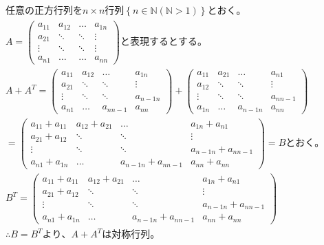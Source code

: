 \documentclass[dvipdfmx,uplatex]{jsarticle}
\begin{document}
  \newpage
  \begin{equation}
    \begin{aligned}
        &任意の正方行列をn \times n行列 \left\{n \in \mathbb{N} (\mathbb{N} > 1) \right\}とおく。\nonumber\\
        &A = \left(
          \begin{array}{cccc}
          a_{11} & a_{12} & \ldots & a_{1n} \\
          a_{21} & \ddots & \ddots & \vdots \\
          \vdots & \ddots & \ddots & \vdots \\
          a_{n1} & \ldots & \ldots & a_{nn}
          \end{array}
          \right)と表現するとする。\nonumber\\
        &A + A^{T} = \left(
          \begin{array}{cccc}
          a_{11} & a_{12} & \ldots & a_{1n} \\
          a_{21} & \ddots & \ddots & \vdots \\
          \vdots & \ddots & \ddots & a_{n-1n} \\
          a_{n1} & \ldots & a_{nn-1} & a_{nn}
          \end{array}
          \right) + 
          \left(
          \begin{array}{cccc}
          a_{11} & a_{21} & \ldots & a_{n1} \\
          a_{12} & \ddots & \ddots & \vdots \\
          \vdots & \ddots & \ddots & a_{nn-1} \\
          a_{1n} & \ldots & a_{n-1n} & a_{nn}
          \end{array}
          \right) \nonumber\\
        &= \left(
          \begin{array}{cccc}
          a_{11} + a_{11} & a_{12} + a_{21} & \ldots & a_{1n} + a_{n1} \\
          a_{21} + a_{12} & \ddots & \ddots & \vdots \\
          \vdots & \ddots & \ddots & a_{n-1n} + a_{nn-1} \\
          a_{n1} + a_{1n} & \ldots & a_{n-1n} + a_{nn-1} & a_{nn} + a_{nn}
          \end{array}
          \right) = B とおく。\nonumber\\
        & B^{T} = \left(
          \begin{array}{cccc}
          a_{11} + a_{11} & a_{12} + a_{21} & \ldots & a_{1n} + a_{n1} \\
          a_{21} + a_{12} & \ddots & \ddots & \vdots \\
          \vdots & \ddots & \ddots & a_{n-1n} + a_{nn-1} \\
          a_{n1} + a_{1n} & \ldots & a_{n-1n} + a_{nn-1} & a_{nn} + a_{nn}
          \end{array}
          \right)\nonumber\\
        & \therefore B=B^{T}より、A + A^{T}は対称行列。\nonumber\\
    \end{aligned}
  \end{equation}
\end{document}
